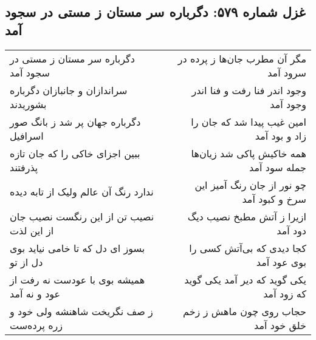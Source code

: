 \begin{center}
\section*{غزل شماره ۵۷۹: دگرباره سر مستان ز مستی در سجود آمد}
\label{sec:0579}
\begin{longtable}{l p{0.5cm} r}
دگرباره سر مستان ز مستی در سجود آمد
&&
مگر آن مطرب جان‌ها ز پرده در سرود آمد
\\
سراندازان و جانبازان دگرباره بشوریدند
&&
وجود اندر فنا رفت و فنا اندر وجود آمد
\\
دگرباره جهان پر شد ز بانگ صور اسرافیل
&&
امین غیب پیدا شد که جان را زاد و بود آمد
\\
ببین اجزای خاکی را که جان تازه پذرفتند
&&
همه خاکیش پاکی شد زیان‌ها جمله سود آمد
\\
ندارد رنگ آن عالم ولیک از تابه دیده
&&
چو نور از جان رنگ آمیز این سرخ و کبود آمد
\\
نصیب تن از این رنگست نصیب جان از این لذت
&&
ازیرا ز آتش مطبخ نصیب دیگ دود آمد
\\
بسوز ای دل که تا خامی نیاید بوی دل از تو
&&
کجا دیدی که بی‌آتش کسی را بوی عود آمد
\\
همیشه بوی با عودست نه رفت از عود و نه آمد
&&
یکی گوید که دیر آمد یکی گوید که زود آمد
\\
ز صف نگریخت شاهنشه ولی خود و زره پرده‌ست
&&
حجاب روی چون ماهش ز زخم خلق خود آمد
\\
\end{longtable}
\end{center}
